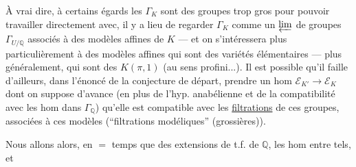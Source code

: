 À vrai dire, à certains égards les $\Gamma_K$ sont des groupes trop gros pour pouvoir travailler directement avec, il y a lieu de regarder $\Gamma_K$ comme un $\varprojlim$ de groupes $\Gamma_{U/\mathbb Q}$ associés à des modèles affines de $K$ --- et on s'intéressera plus particulièrement à des modèles affines qui sont des variétés élémentaires --- plus généralement, qui sont des $K(\pi,1)$ (au sens profini...). Il est possible qu'il faille d'ailleurs, dans l'énoncé de la conjecture de départ, prendre un hom  $\mathcal E_{K'}\longrightarrow\mathcal E_K$ dont on suppose d'avance (en plus de l'hyp. anabélienne et de la compatibilité avec les hom dans $\Gamma_{\mathbb Q}$) qu'elle est compatible avec les \uline{filtrations} de ces groupes, associées à ces modèles (``filtrations modéliques'' (grossières)).

Nous allons alors, en $=$ temps que des extensions de t.f. de $\mathbb Q$, les hom entre tels, et
